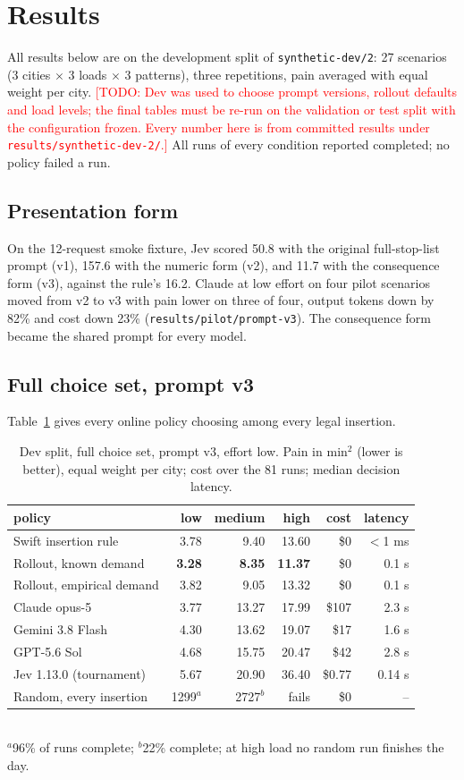 \documentclass[11pt]{article}
\newcommand{\todo}[1]{\textcolor{red}{[TODO: #1]}}
\newcommand{\minsq}{\mathrm{min}^2}
\begin{document}
\section{Results}
\label{sec:results}
All results below are on the development split of \texttt{synthetic-dev/2}: 27 scenarios (3 cities $\times$ 3 loads $\times$ 3 patterns), three repetitions, pain averaged with equal weight per city. \todo{Dev was used to choose prompt versions, rollout defaults and load levels; the final tables must be re-run on the validation or test split with the configuration frozen. Every number here is from committed results under \texttt{results/synthetic-dev-2/}.} All runs of every condition reported completed; no policy failed a run.

\subsection{Presentation form}
\label{sec:form}
On the 12-request smoke fixture, Jev scored 50.8 with the original full-stop-list prompt (v1), 157.6 with the numeric form (v2), and 11.7 with the consequence form (v3), against the rule's 16.2. Claude at low effort on four pilot scenarios moved from v2 to v3 with pain lower on three of four, output tokens down by 82\% and cost down 23\% (\texttt{results/pilot/prompt-v3}). The consequence form became the shared prompt for every model.

\subsection{Full choice set, prompt v3}
\label{sec:full}
Table~\ref{tab:full} gives every online policy choosing among every legal insertion.

\begin{table}[t]
\centering
\caption{Dev split, full choice set, prompt v3, effort low. Pain in $\minsq$ (lower is better), equal weight per city; cost over the 81 runs; median decision latency.}
\label{tab:full}
\begin{tabular}{lrrrrr}
\toprule
policy & low & medium & high & cost & latency \\
\midrule
Swift insertion rule & 3.78 & 9.40 & 13.60 & \$0 & $<$1 ms \\
Rollout, known demand & \textbf{3.28} & \textbf{8.35} & \textbf{11.37} & \$0 & 0.1 s \\
Rollout, empirical demand & 3.82 & 9.05 & 13.32 & \$0 & 0.1 s \\
Claude opus-5 & 3.77 & 13.27 & 17.99 & \$107 & 2.3 s \\
Gemini 3.8 Flash & 4.30 & 13.62 & 19.07 & \$17 & 1.6 s \\
GPT-5.6 Sol & 4.68 & 15.75 & 20.47 & \$42 & 2.8 s \\
Jev 1.13.0 (tournament) & 5.67 & 20.90 & 36.40 & \$0.77 & 0.14 s \\
Random, every insertion & 1299$^{a}$ & 2727$^{b}$ & fails & \$0 & -- \\
\bottomrule
\end{tabular}
\\ \footnotesize $^{a}$96\% of runs complete; $^{b}$22\% complete; at high load no random run finishes the day.
\end{table}
\end{document}
